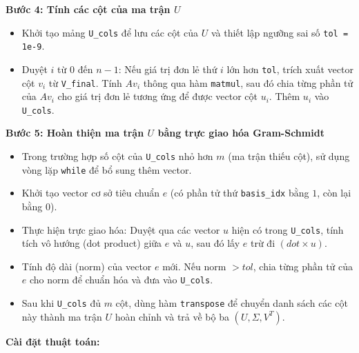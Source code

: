 \documentclass[a4paper]{article}
\begin{document}
\textbf{Bước 4: Tính các cột của ma trận $U$}
\begin{itemize}
    \item Khởi tạo mảng \texttt{U\_cols} để lưu các cột của $U$ và thiết lập ngưỡng sai số \texttt{tol = 1e-9}.
    \item Duyệt $i$ từ $0$ đến $n-1$: Nếu giá trị đơn lẻ thứ $i$ lớn hơn \texttt{tol}, trích xuất vector cột $v_i$ từ \texttt{V\_final}. Tính $Av_i$ thông qua hàm \texttt{matmul}, sau đó chia từng phần tử của $Av_i$ cho giá trị đơn lẻ tương ứng để được vector cột $u_i$. Thêm $u_i$ vào \texttt{U\_cols}.
\end{itemize}

\textbf{Bước 5: Hoàn thiện ma trận $U$ bằng trực giao hóa Gram-Schmidt}
\begin{itemize}
    \item Trong trường hợp số cột của \texttt{U\_cols} nhỏ hơn $m$ (ma trận thiếu cột), sử dụng vòng lặp \texttt{while} để bổ sung thêm vector.
    \item Khởi tạo vector cơ sở tiêu chuẩn $e$ (có phần tử thứ \texttt{basis\_idx} bằng $1$, còn lại bằng $0$).
    \item Thực hiện trực giao hóa: Duyệt qua các vector $u$ hiện có trong \texttt{U\_cols}, tính tích vô hướng (dot product) giữa $e$ và $u$, sau đó lấy $e$ trừ đi $(dot \times u)$.
    \item Tính độ dài (norm) của vector $e$ mới. Nếu norm $> tol$, chia từng phần tử của $e$ cho norm để chuẩn hóa và đưa vào \texttt{U\_cols}.
    \item Sau khi \texttt{U\_cols} đủ $m$ cột, dùng hàm \texttt{transpose} để chuyển danh sách các cột này thành ma trận $U$ hoàn chỉnh và trả về bộ ba $(U, \Sigma, V^T)$.
\end{itemize}

\textbf{Cài đặt thuật toán:}
\end{document}
